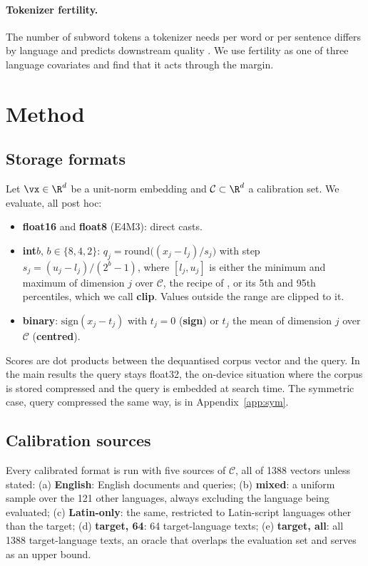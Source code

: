 \documentclass[10pt]{article}
\begin{document}
\paragraph{Tokenizer fertility.} The number of subword tokens a tokenizer needs per word or per sentence differs by language and predicts downstream quality \citep{rust2021tokenizer}. We use fertility as one of three language covariates and find that it acts through the margin.

\section{Method}
\subsection{Storage formats}
Let $\vx\in\R^d$ be a unit-norm embedding and $\mathcal{C}\subset\R^d$ a calibration set. We evaluate, all post hoc:
\begin{itemize}[nosep]
\item \textbf{float16} and \textbf{float8} (E4M3): direct casts.
\item \textbf{int$b$}, $b\in\{8,4,2\}$: $q_j=\mathrm{round}\big((x_j-l_j)/s_j\big)$ with step $s_j=(u_j-l_j)/(2^b-1)$, where $[l_j,u_j]$ is either the minimum and maximum of dimension $j$ over $\mathcal{C}$, the recipe of \citet{shakir2024quant}, or its 5th and 95th percentiles, which we call \textbf{clip}. Values outside the range are clipped to it.
\item \textbf{binary}: $\mathrm{sign}(x_j-t_j)$ with $t_j=0$ (\textbf{sign}) or $t_j$ the mean of dimension $j$ over $\mathcal{C}$ (\textbf{centred}).
\end{itemize}
Scores are dot products between the dequantised corpus vector and the query. In the main results the query stays float32, the on-device situation where the corpus is stored compressed and the query is embedded at search time. The symmetric case, query compressed the same way, is in Appendix~\ref{app:sym}.

\subsection{Calibration sources}\label{sec:calsources}
Every calibrated format is run with five sources of $\mathcal{C}$, all of 1388 vectors unless stated: (a) \textbf{English}: English documents and queries; (b) \textbf{mixed}: a uniform sample over the 121 other languages, always excluding the language being evaluated; (c) \textbf{Latin-only}: the same, restricted to Latin-script languages other than the target; (d) \textbf{target, 64}: 64 target-language texts; (e) \textbf{target, all}: all 1388 target-language texts, an oracle that overlaps the evaluation set and serves as an upper bound.
\end{document}
